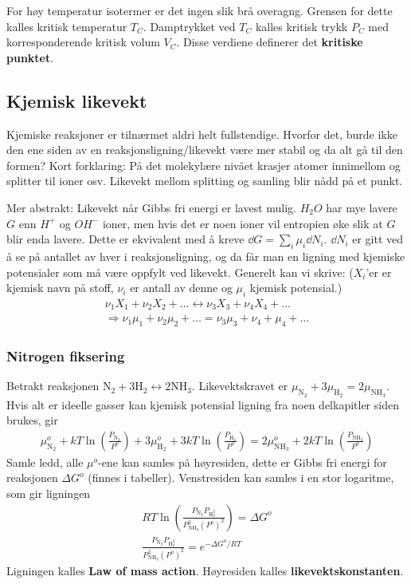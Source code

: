 \documentclass[12pt]{article}
\begin{document}
For høy temperatur isotermer er det ingen slik brå overagng. Grensen for dette kalles
kritisk temperatur $T_C$. Damptrykket ved $T_C$ kalles kritisk trykk $P_C$ med
korresponderende kritisk volum $V_C$. Disse verdiene definerer det \textbf{kritiske punktet}.

\subsection{Kjemisk likevekt}
Kjemiske reaksjoner er tilnærmet aldri helt fullstendige. Hvorfor det, burde ikke den
ene siden av en reaksjonsligning/likevekt være mer stabil og da alt gå til den formen? Kort forklaring:
På det molekylære nivået krasjer atomer innimellom og splitter til ioner osv. Likevekt
mellom splitting og samling blir nådd på et punkt.

Mer abstrakt: Likevekt når Gibbs fri energi er lavest mulig. $H_2 O$ har mye lavere
$G$ enn $H^+$ og $OH^-$ ioner, men hvis det er noen ioner vil entropien øke slik at
$G$ blir enda lavere. Dette er ekvivalent med å kreve $\dd G = \sum_i \mu_i \dd N_i$.
$\dd N_i$ er gitt ved å se på antallet av hver i reaksjonsligning, og da får man
en ligning med kjemiske potensialer som må være oppfylt ved likevekt. Generelt kan
vi skrive: ($X_i$'er er kjemisk navn på stoff, $\nu_i$ er antall av denne og $\mu_i$ kjemisk potensial.)
\begin{align*}
  \nu_1 X_1 + \nu_2 X_2 + \hdots \leftrightarrow \nu_3 X_3 + \nu_4 X_4 + \hdots \\
  \Rightarrow \nu_1 \mu_1 + \nu_2 \mu_2 + \hdots = \nu_3 \mu_3 + \nu_4 + \mu_4 + \hdots
\end{align*}
\subsubsection{Nitrogen fiksering}
Betrakt reaksjonen $\text{N}_2 + 3 \text{H}_2 \leftrightarrow 2 \text{NH}_3$.
Likevektskravet er $\mu_{\text{N}_2} + 3 \mu_{\text{H}_2} = 2 \mu_{\text{NH}_3}$. Hvis alt er
ideelle gasser kan kjemisk potensial ligning fra noen delkapitler siden brukes, gir
\begin{align*}
  \mu^o_{\text{N}_2} + kT \ln{\left( \frac{P_{\text{N}_2}}{P^o} \right)} + 3 \mu^o_{\text{H}_2} + 3kT\ln{\left( \frac{P_{\text{H}_2}}{P^o} \right)} = 2 \mu^o_{\text{NH}_3} + 2kT \ln{\left( \frac{P_{\text{NH}_3}}{P^o} \right)}
\end{align*}
Samle ledd, alle $\mu^o$-ene kan samles på høyresiden, dette er Gibbs fri energi for reaksjonen $\Delta G^o$ (finnes i tabeller). Venstresiden
kan samles i en stor logaritme, som gir ligningen
\begin{align*}
  RT \ln{\left( \frac{P_{\text{N}_2} P_{\text{H}_2^3}}{P^2_{\text{NH}_3} (P^o)^2} \right)} = \Delta G^o \\
  \frac{P_{\text{N}_2} P_{\text{H}_2^3}}{P^2_{\text{NH}_3} (P^o)^2} = e^{-\Delta G^o / RT}
\end{align*}
Ligningen kalles \textbf{Law of mass action}. Høyresiden kalles \textbf{likevektskonstanten}.
\end{document}
